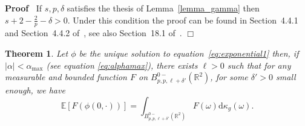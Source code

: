 \documentclass[a4paper,10pt]{article}
\newcommand{\mathd}{\mathrm{d}}
\newenvironment{proof}{\noindent\textbf{Proof\ }}{\hspace*{\fill}$\Box$\medskip}
\newtheorem{theorem}{Theorem}
\begin{document}
\begin{proof}
  If $s, p, \delta$ satisfies the thesis of Lemma~\ref{lemma_gamma} then $s +
  2 - \frac{2}{p} - \delta > 0$. Under this condition the proof can be found
  in Section~4.4.1 and Section~4.4.2 of~{\cite{Triebel1992}}, see also
  Section~18.1 of~{\cite{Triebel1997}}.
\end{proof}

\begin{theorem}
  \label{theorem_dimensionalreduction1}Let $\phi$ be the unique solution to
  equation~{\eqref{eq:exponential1}} then, if $| \alpha | < \alpha_{\text{max}}$ (see equation \eqref{eq:alphamax}), there exists $\ell > 0$ such that for any measurable and
  bounded function $F$ on $B^{0 -}_{p, p, \ell + \delta'} (\mathbb{R}^2)$, for
  some $\delta' > 0$ small enough, we have
  \begin{equation}
    \mathbb{E} [F (\phi (0, \cdot))] = \int_{B^{0 -}_{p, p, \ell + \delta'}
    (\mathbb{R}^2)} F (\omega) \mathd \kappa_g (\omega) . \label{eq:final}
  \end{equation}
\end{theorem}
\end{document}
